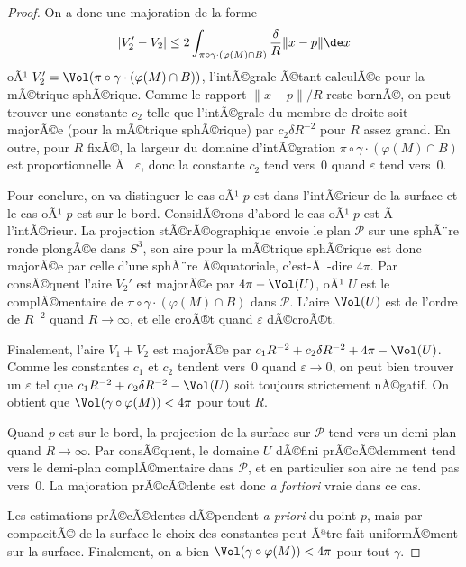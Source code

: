 \documentclass[11pt,a4paper]{smfart}
\begin{document}
\begin{proof}
On a donc une majoration de la forme
\begin{equation}
|V_2'-V_2|\leq
2\int_{\pi\circ\gamma\cdot(\varphi(M)\cap B)}\frac\delta R\|x-p\|\de x
\end{equation}
oÃ¹ $V_2'=\Vol(\pi\circ\gamma\cdot(\varphi(M)\cap B))$, l'intÃ©grale Ã©tant
calculÃ©e pour la mÃ©trique sphÃ©rique. Comme le rapport
$\|x-p\|/R$ reste bornÃ©, on peut trouver
une constante $c_2$ telle que l'intÃ©grale du membre de droite soit
majorÃ©e (pour la mÃ©trique sphÃ©rique) par
$c_2\delta R^{-2}$ pour $R$ assez grand. En outre, pour $R$ fixÃ©, la largeur
du domaine d'intÃ©gration $\pi\circ\gamma\cdot(\varphi(M)\cap B)$
est proportionnelle Ã  $\varepsilon$, donc la constante $c_2$ tend vers~0
quand $\varepsilon$ tend vers~0.

Pour conclure, on va distinguer le cas oÃ¹ $p$ est dans l'intÃ©rieur de
la surface et le cas oÃ¹ $p$ est sur le bord. ConsidÃ©rons d'abord
le cas oÃ¹ $p$ est Ã  l'intÃ©rieur. La projection stÃ©rÃ©ographique envoie le
plan $\mathcal P$ sur une sphÃ¨re ronde plongÃ©e dans $S^3$, son aire
pour la mÃ©trique sphÃ©rique est donc majorÃ©e par celle d'une sphÃ¨re
Ã©quatoriale, c'est-Ã -dire $4\pi$. Par consÃ©quent l'aire $V_2'$ est majorÃ©e
par $4\pi-\Vol(U)$,
oÃ¹ $U$ est le complÃ©mentaire de $\pi\circ\gamma\cdot(\varphi(M)\cap B)$
dans $\mathcal P$. L'aire $\Vol(U)$ est de l'ordre de $R^{-2}$ quand
$R\to\infty$, et elle croÃ®t quand $\varepsilon$ dÃ©croÃ®t.

Finalement, l'aire $V_1+V_2$ est majorÃ©e par $c_1R^{-2}+c_2\delta R^{-2}+
4\pi-\Vol(U)$. Comme les constantes $c_1$ et $c_2$ tendent vers~0 quand
$\varepsilon\to0$, on peut bien trouver un $\varepsilon$ tel que
$c_1R^{-2}+c_2\delta R^{-2}-\Vol(U)$ soit toujours strictement nÃ©gatif.
On obtient que $\Vol(\gamma\circ\varphi(M))<4\pi$ pour tout $R$.

Quand $p$ est sur le bord, la projection de la surface sur $\mathcal P$
tend vers un demi-plan quand $R\to\infty$. Par consÃ©quent, le domaine
$U$ dÃ©fini prÃ©cÃ©demment tend vers le demi-plan complÃ©mentaire dans
$\mathcal P$, et en particulier son aire ne tend pas vers~0. La majoration
prÃ©cÃ©dente est donc \emph{a fortiori} vraie dans ce cas.

Les estimations prÃ©cÃ©dentes dÃ©pendent \emph{a priori} du point $p$,
mais par compacitÃ© de la surface le choix des constantes peut Ãªtre fait
uniformÃ©ment sur la surface. Finalement, on a bien
$\Vol(\gamma\circ\varphi(M))<4\pi$ pour tout $\gamma$.
\end{proof}
\end{document}
